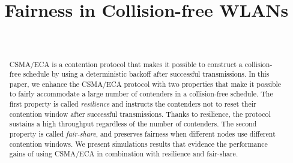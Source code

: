 \documentclass[conference]{IEEEtran}
\begin{document}
 \title{Fairness in Collision-free WLANs}


  \author{
      \\
  }



\maketitle

\begin{abstract}

\boldmath CSMA/ECA is a contention protocol that makes it possible to construct a collision-free schedule by using a deterministic backoff after successful transmissions. In this paper, we enhance the CSMA/ECA protocol with two properties that make it possible to fairly accommodate a large number of contenders in a collision-free schedule. The first property is called \emph{resilience} and instructs the contenders not to reset their contention window after successful transmissions. Thanks to resilience, the protocol sustains a high throughput regardless of the number of contenders. The second property is called \emph{fair-share}, and preserves fairness when different nodes use different contention windows. We present simulations results that evidence the performance gains of using CSMA/ECA in combination with resilience and fair-share.

\end{abstract}
\end{document}
